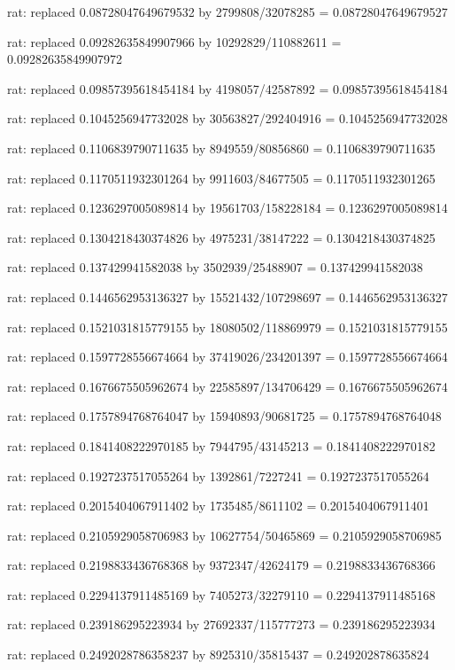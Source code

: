 \documentclass[a4paper,10pt]{article}
\begin{document}
\begin{eulernotebook}
\begin{eulercomment}
\begin{eulercomment}
\begin{eulercomment}
\begin{eulercomment}
\begin{eulercomment}
\begin{eulercomment}
\begin{eulercomment}
\begin{eulercomment}
\begin{eulercomment}
\begin{eulercomment}
\begin{eulercomment}
\begin{eulercomment}
\begin{eulercomment}
\begin{eulercomment}
\begin{eulercomment}
\begin{eulercomment}
\begin{euleroutput}
  rat: replaced 0.08728047649679532 by 2799808/32078285 = 0.08728047649679527
  
  rat: replaced 0.09282635849907966 by 10292829/110882611 = 0.09282635849907972
  
  rat: replaced 0.09857395618454184 by 4198057/42587892 = 0.09857395618454184
  
  rat: replaced 0.1045256947732028 by 30563827/292404916 = 0.1045256947732028
  
  rat: replaced 0.1106839790711635 by 8949559/80856860 = 0.1106839790711635
  
  rat: replaced 0.1170511932301264 by 9911603/84677505 = 0.1170511932301265
  
  rat: replaced 0.1236297005089814 by 19561703/158228184 = 0.1236297005089814
  
  rat: replaced 0.1304218430374826 by 4975231/38147222 = 0.1304218430374825
  
  rat: replaced 0.137429941582038 by 3502939/25488907 = 0.137429941582038
  
  rat: replaced 0.1446562953136327 by 15521432/107298697 = 0.1446562953136327
  
  rat: replaced 0.1521031815779155 by 18080502/118869979 = 0.1521031815779155
  
  rat: replaced 0.1597728556674664 by 37419026/234201397 = 0.1597728556674664
  
  rat: replaced 0.1676675505962674 by 22585897/134706429 = 0.1676675505962674
  
  rat: replaced 0.1757894768764047 by 15940893/90681725 = 0.1757894768764048
  
  rat: replaced 0.1841408222970185 by 7944795/43145213 = 0.1841408222970182
  
  rat: replaced 0.1927237517055264 by 1392861/7227241 = 0.1927237517055264
  
  rat: replaced 0.2015404067911402 by 1735485/8611102 = 0.2015404067911401
  
  rat: replaced 0.2105929058706983 by 10627754/50465869 = 0.2105929058706985
  
  rat: replaced 0.2198833436768368 by 9372347/42624179 = 0.2198833436768366
  
  rat: replaced 0.2294137911485169 by 7405273/32279110 = 0.2294137911485168
  
  rat: replaced 0.239186295223934 by 27692337/115777273 = 0.239186295223934
  
  rat: replaced 0.2492028786358237 by 8925310/35815437 = 0.249202878635824
  

\end{euleroutput}
\end{eulercomment}
\end{eulercomment}
\end{eulercomment}
\end{eulercomment}
\end{eulercomment}
\end{eulercomment}
\end{eulercomment}
\end{eulercomment}
\end{eulercomment}
\end{eulercomment}
\end{eulercomment}
\end{eulercomment}
\end{eulercomment}
\end{eulercomment}
\end{eulercomment}
\end{eulercomment}
\end{eulernotebook}
\end{document}
